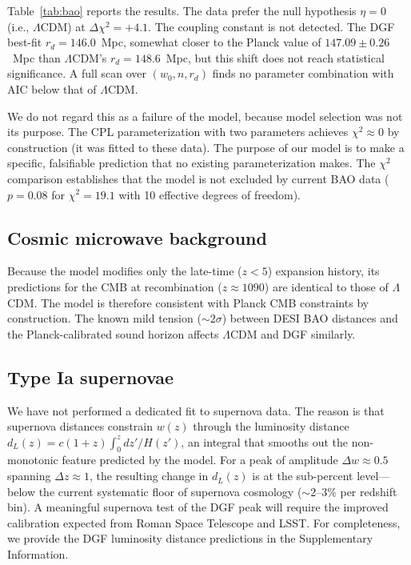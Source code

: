 \documentclass[12pt,a4paper]{article}
\begin{document}
Table~\ref{tab:bao} reports the results. The data prefer the null hypothesis $\eta=0$ (i.e., $\Lambda$CDM) at $\Delta\chi^2=+4.1$. The coupling constant is not detected. The DGF best-fit $r_d=146.0$~Mpc, somewhat closer to the Planck value of $147.09\pm0.26$~Mpc than $\Lambda$CDM's $r_d=148.6$~Mpc, but this shift does not reach statistical significance. A full scan over $(w_0,n,r_d)$ finds no parameter combination with AIC below that of $\Lambda$CDM.

We do not regard this as a failure of the model, because model selection was not its purpose. The CPL parameterization with two parameters achieves $\chi^2\approx0$ by construction (it was fitted to these data). The purpose of our model is to make a specific, falsifiable prediction that no existing parameterization makes. The $\chi^2$ comparison establishes that the model is not excluded by current BAO data ($p=0.08$ for $\chi^2=19.1$ with 10 effective degrees of freedom).

\subsection*{Cosmic microwave background}

Because the model modifies only the late-time ($z<5$) expansion history, its predictions for the CMB at recombination ($z\approx1090$) are identical to those of $\Lambda$CDM. The model is therefore consistent with Planck CMB constraints by construction. The known mild tension ($\sim2\sigma$) between DESI BAO distances and the Planck-calibrated sound horizon affects $\Lambda$CDM and DGF similarly.

\subsection*{Type Ia supernovae}

We have not performed a dedicated fit to supernova data. The reason is that supernova distances constrain $w(z)$ through the luminosity distance $d_L(z)=c(1+z)\int_0^z dz'/H(z')$, an integral that smooths out the non-monotonic feature predicted by the model. For a peak of amplitude $\Delta w\approx0.5$ spanning $\Delta z\approx1$, the resulting change in $d_L(z)$ is at the sub-percent level---below the current systematic floor of supernova cosmology ($\sim$2--3\% per redshift bin). A meaningful supernova test of the DGF peak will require the improved calibration expected from Roman Space Telescope and LSST. For completeness, we provide the DGF luminosity distance predictions in the Supplementary Information.
\end{document}
